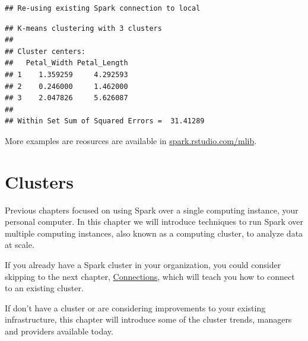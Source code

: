 \documentclass[]{book}
\newenvironment{Shaded}{\begin{snugshade}}{\end{snugshade}}
\newcommand{\CommentTok}[1]{\textcolor[rgb]{0.56,0.35,0.01}{\textit{#1}}}
\newcommand{\DataTypeTok}[1]{\textcolor[rgb]{0.13,0.29,0.53}{#1}}
\newcommand{\DecValTok}[1]{\textcolor[rgb]{0.00,0.00,0.81}{#1}}
\newcommand{\KeywordTok}[1]{\textcolor[rgb]{0.13,0.29,0.53}{\textbf{#1}}}
\newcommand{\NormalTok}[1]{#1}
\newcommand{\OperatorTok}[1]{\textcolor[rgb]{0.81,0.36,0.00}{\textbf{#1}}}
\newcommand{\OtherTok}[1]{\textcolor[rgb]{0.56,0.35,0.01}{#1}}
\newcommand{\StringTok}[1]{\textcolor[rgb]{0.31,0.60,0.02}{#1}}
\theoremstyle{definition}
\theoremstyle{definition}
\theoremstyle{definition}
\theoremstyle{remark}
\begin{document}
\begin{verbatim}
## Re-using existing Spark connection to local
\end{verbatim}

\begin{Shaded}
\end{Shaded}

\begin{verbatim}
## K-means clustering with 3 clusters
## 
## Cluster centers:
##   Petal_Width Petal_Length
## 1    1.359259     4.292593
## 2    0.246000     1.462000
## 3    2.047826     5.626087
## 
## Within Set Sum of Squared Errors =  31.41289
\end{verbatim}

More examples are reosurces are available in
\href{http://spark.rstudio.com/mlib/}{spark.rstudio.com/mlib}.

\hypertarget{clusters}{%
\chapter{Clusters}\label{clusters}}

Previous chapters focused on using Spark over a single computing
instance, your personal computer. In this chapter we will introduce
techniques to run Spark over multiple computing instances, also known as
a computing cluster, to analyze data at scale.

If you already have a Spark cluster in your organization, you could
consider skipping to the next chapter,
\protect\hyperlink{connections-1}{Connections}, which will teach you how
to connect to an existing cluster.

If don't have a cluster or are considering improvements to your existing
infrastructure, this chapter will introduce some of the cluster trends,
managers and providers available today.
\end{document}
